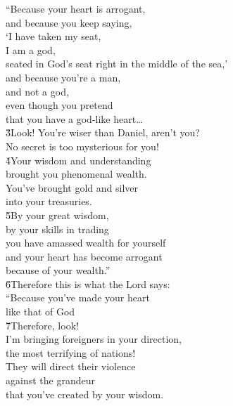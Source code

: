\begin{poetry}
\poeml ``Because your heart is arrogant, \\
\poemll    and because you keep saying, \\
\poeml `I have taken my seat, \\
\poemll    I am a god, \\
\poemlll       seated in God's seat right in the middle of the sea,' \\
\poeml and because you're a man, \\
\poemll    and not a god, \\
\poeml even though you pretend \\
\poemll    that you have a god-like heart{\ldots} \\
\poeml \v{3}Look! You're wiser than Daniel, aren't you? \\
\poemll    No secret is too mysterious for you! \\
\poeml \v{4}Your wisdom and understanding \\
\poemll    brought you phenomenal wealth. \\
\poeml You've brought gold and silver \\
\poemll    into your treasuries. \\
\poeml \v{5}By your great wisdom, \\
\poemll    by your skills in trading \\
\poeml you have amassed wealth for yourself \\
\poemll    and your heart has become arrogant \\
\poemlll       because of your wealth.'' \\
\poeml \v{6}Therefore this is what the Lord  says: \\
\poeml ``Because you've made your heart \\
\poemll    like that of God \\
\poeml \v{7}Therefore, look! \\
\poemll    I'm bringing foreigners in your direction, \\
\poemlll       the most terrifying of nations! \\
\poeml They will direct their violence \\
\poemll    against the grandeur \\
\poemlll       that you've created by your wisdom. \\

\end{poetry}
